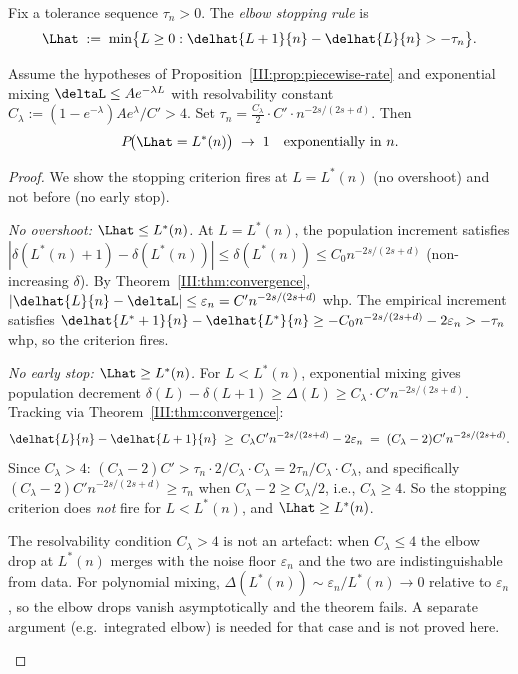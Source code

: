 \begin{definition}
\label{III:def:elbow}
Fix a tolerance sequence $\tau_n > 0$.
The \emph{elbow stopping rule} is
\[
  \Lhat \;:=\; \min\bigl\{L \geq 0 :
    \delhat{L+1}{n} - \delhat{L}{n} > -\tau_n\bigr\}.
\]
\end{definition}

\begin{theorem}
\label{III:thm:elbow}
Assume the hypotheses of Proposition~\ref{III:prop:piecewise-rate} and
exponential mixing $\deltaL \leq A e^{-\lambda L}$ with resolvability constant
$C_\lambda := (1-e^{-\lambda}) A e^\lambda / C' > 4$.
Set $\tau_n = \frac{C_\lambda}{2} \cdot C' \cdot n^{-2s/(2s+d)}$.
Then
\[
  P\!\bigl(\Lhat = L^*(n)\bigr) \;\to\; 1
  \quad\text{exponentially in } n.
\]
\end{theorem}

\begin{proof}
We show the stopping criterion fires at $L = L^*(n)$ (no overshoot)
and not before (no early stop).

\emph{No overshoot: $\Lhat \leq L^*(n)$.}
At $L = L^*(n)$, the population increment satisfies
$|\delta(L^*(n)+1) - \delta(L^*(n))| \leq \delta(L^*(n)) \leq C_0 n^{-2s/(2s+d)}$ (non-increasing $\delta$).
By Theorem~\ref{III:thm:convergence}, $|\delhat{L}{n} - \deltaL| \leq \varepsilon_n = C' n^{-2s/(2s+d)}$ whp.
The empirical increment satisfies
$\delhat{L^*+1}{n} - \delhat{L^*}{n} \geq -C_0 n^{-2s/(2s+d)} - 2\varepsilon_n > -\tau_n$ whp,
so the criterion fires.

\emph{No early stop: $\Lhat \geq L^*(n)$.}
For $L < L^*(n)$, exponential mixing gives population decrement
$\delta(L) - \delta(L+1) \geq \Delta(L) \geq C_\lambda \cdot C' n^{-2s/(2s+d)}$.
Tracking via Theorem~\ref{III:thm:convergence}:
\[
  \delhat{L}{n} - \delhat{L+1}{n}
  \;\geq\; C_\lambda C' n^{-2s/(2s+d)} - 2\varepsilon_n
  \;=\; (C_\lambda - 2)C' n^{-2s/(2s+d)}.
\]
Since $C_\lambda > 4$: $(C_\lambda - 2)C' > \tau_n \cdot 2/C_\lambda \cdot C_\lambda = 2\tau_n/C_\lambda \cdot C_\lambda$,
and specifically $(C_\lambda - 2)C' n^{-2s/(2s+d)} \geq \tau_n$ when
$C_\lambda - 2 \geq C_\lambda/2$, i.e., $C_\lambda \geq 4$.
So the stopping criterion does \emph{not} fire for $L < L^*(n)$, and $\Lhat \geq L^*(n)$.

\begin{remark}
The resolvability condition $C_\lambda > 4$ is not an artefact: when
$C_\lambda \leq 4$ the elbow drop at $L^*(n)$ merges with the noise floor
$\varepsilon_n$ and the two are indistinguishable from data.
For polynomial mixing, $\Delta(L^*(n)) \sim \varepsilon_n / L^*(n) \to 0$
relative to $\varepsilon_n$, so the elbow drops vanish asymptotically and
the theorem fails.
A separate argument (e.g.\ integrated elbow) is needed for that case and is
not proved here.
\end{remark}
\end{proof}

